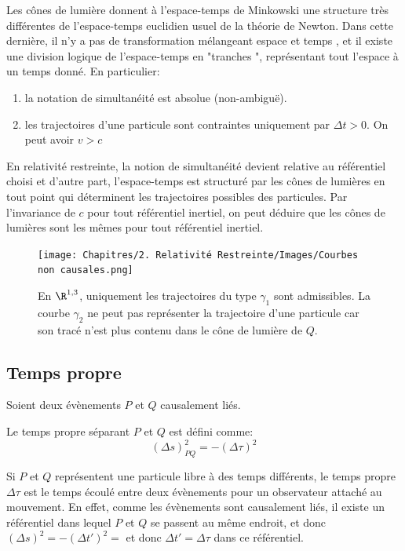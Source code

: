     Les cônes de lumière donnent à l'espace-temps de Minkowski une structure très différentes de l'espace-temps euclidien usuel de la théorie de Newton. Dans cette dernière, il n'y a pas de transformation mélangeant espace et temps , et il existe une division logique de l'espace-temps en "tranches ", représentant tout l'espace à un temps donné. En particulier:
    \begin{enumerate}
        \item la notation de simultanéité est absolue (non-ambiguë).
        \item les trajectoires d'une particule sont contraintes uniquement par $\Delta t> 0$. On peut avoir $v>c$
    \end{enumerate}
    En relativité restreinte, la notion de simultanéité devient relative au référentiel choisi et d'autre part, l'espace-temps est structuré par les cônes de lumières en tout point qui déterminent les trajectoires possibles des particules. Par l'invariance de $c$ pour tout référentiel inertiel, on peut déduire que les cônes de lumières sont les mêmes pour tout référentiel inertiel.
    \begin{figure}[H]
        \centering
        \texttt{[image: Chapitres/2. Relativité Restreinte/Images/Courbes non causales.png]}
        \caption{En $\R^{1,3}$, uniquement les trajectoires du type $\gamma_1$ sont admissibles. La courbe $\gamma_2$ ne peut pas représenter la trajectoire d'une particule car son tracé n'est plus contenu dans le cône de lumière de $Q$.}
        \label{fig:2.3}
    \end{figure}
\subsection{Temps propre}

Soient deux évènements $P$ et $Q$ causalement liés. 
\begin{theoremframe}
    \begin{defi}
        Le temps propre séparant $P$ et $Q$ est défini comme:
        \begin{equation}
            (\Delta s)^2_{PQ} = -(\Delta \tau)^2
        \end{equation}
    \end{defi}
\end{theoremframe}

Si $P$ et $Q$ représentent une particule libre à des temps différents, le temps propre $\Delta \tau $ est le temps écoulé entre deux évènements pour un observateur attaché au mouvement. En effet, comme les évènements sont causalement liés, il existe un référentiel dans lequel $P$ et $Q$ se passent au même endroit, et donc $(\Delta s)^2=-(\Delta t')^2 =$ et donc $\Delta t' = \Delta \tau$ dans ce référentiel.

